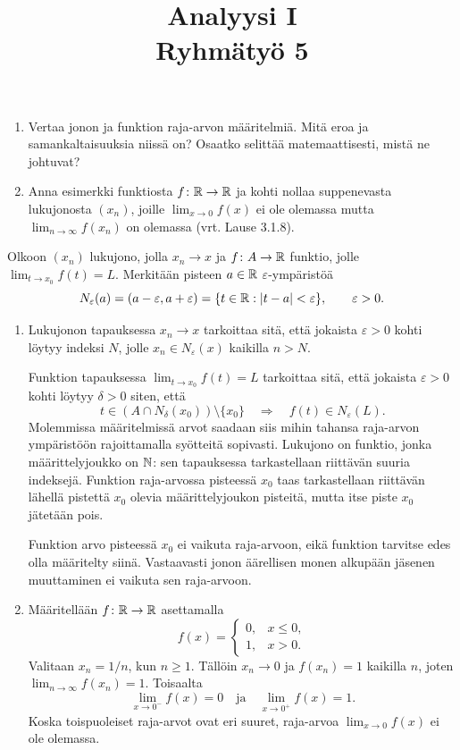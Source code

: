 \documentclass[11pt,a4paper]{amsart}
\title{Analyysi I\\Ryhmätyö 5}
\author{}
\date{}
\begin{document}

\begin{exercise}
  \leavevmode\par
  \begin{enumerate}[label=(\alph*), nosep]
    \item Vertaa jonon ja funktion raja-arvon määritelmiä. Mitä eroa ja
      samankaltaisuuksia niissä on? Osaatko selittää matemaattisesti,
      mistä ne johtuvat?
    \item Anna esimerkki funktiosta \(f\colon \mathbb{R} \to \mathbb{R}\) ja kohti
      nollaa suppenevasta lukujonosta \((x_n)\), joille
      \(\lim_{x \to 0} f(x)\) ei ole olemassa mutta
      \(\lim_{n \to \infty} f(x_n)\) on olemassa (vrt. Lause 3.1.8).
  \end{enumerate}
\end{exercise}

\begin{solution}
  Olkoon \((x_n)\) lukujono, jolla \(x_n \to x\) ja \(f \colon A \to \mathbb{R}\)
  funktio, jolle \(\lim_{t \to x_0} f(t) = L\).
  Merkitään pisteen \(a\in\mathbb{R}\) \(\varepsilon\)-ympäristöä
  \[
    N_\varepsilon(a)=(a-\varepsilon,a+\varepsilon)
    =\{t\in\mathbb{R} : |t-a|<\varepsilon\}, \qquad \varepsilon>0.
  \]
\begin{enumerate}[label=\alph*), nosep]
  \item Lukujonon tapauksessa \(x_n\to x\) tarkoittaa sitä, että jokaista
    \(\varepsilon>0\) kohti löytyy indeksi \(N\), jolle
    \(x_n\in N_\varepsilon(x)\) kaikilla \(n > N\).

    Funktion tapauksessa \(\lim_{t\to x_0}f(t)=L\) tarkoittaa sitä, että
    jokaista \(\varepsilon>0\) kohti löytyy \(\delta>0\) siten, että
    \[
      t\in (A\cap N_\delta(x_0))\setminus\{x_0\}
      \quad\Longrightarrow\quad f(t)\in N_\varepsilon(L).
    \]
    Molemmissa määritelmissä arvot saadaan siis mihin tahansa raja-arvon
    ympäristöön rajoittamalla syötteitä sopivasti. Lukujono on funktio,
    jonka määrittelyjoukko on \(\mathbb{N}\): sen tapauksessa tarkastellaan
    riittävän suuria indeksejä. Funktion raja-arvossa pisteessä \(x_0\)
    taas tarkastellaan riittävän lähellä pistettä \(x_0\) olevia
    määrittelyjoukon pisteitä, mutta itse piste \(x_0\) jätetään pois.

    Funktion arvo pisteessä \(x_0\) ei vaikuta raja-arvoon, eikä funktion
    tarvitse edes olla määritelty siinä. Vastaavasti jonon äärellisen
    monen alkupään jäsenen muuttaminen ei vaikuta sen raja-arvoon.
  \item Määritellään \(f\colon\mathbb{R}\to\mathbb{R}\) asettamalla
    \[
      f(x)=
      \begin{cases}
        0, & x\le 0,\\
        1, & x>0.
      \end{cases}
    \]
    Valitaan \(x_n=1/n\), kun \(n\ge 1\). Tällöin \(x_n\to 0\) ja
    \(f(x_n)=1\) kaikilla \(n\), joten
    \(\lim_{n\to\infty}f(x_n)=1\).
    Toisaalta
    \[
      \lim_{x\to 0^-}f(x)=0
      \quad\text{ja}\quad
      \lim_{x\to 0^+}f(x)=1.
    \]
    Koska toispuoleiset raja-arvot ovat eri suuret,
    raja-arvoa \(\lim_{x\to 0}f(x)\) ei ole olemassa.
\end{enumerate}
\end{solution}
\end{document}
